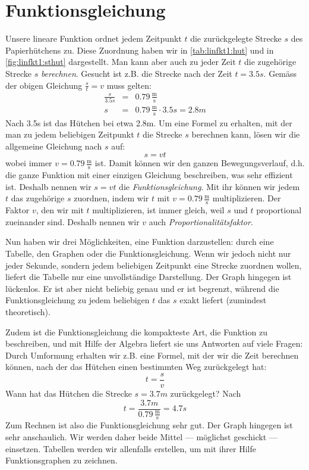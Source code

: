 \documentclass[%
11pt,%
twoside,%
titlepage,%
german,%
headsepline%
]{scrartcl}
\newcommand{\ufrac}[2]{\ensuremath{\,\frac{\mathrm{#1}}{\mathrm{#2}}}}
\begin{document}
\section{Funktionsgleichung}
\label{linfkt1:gleichung}

Unsere lineare Funktion ordnet jedem Zeitpunkt $t$ die zur\"uckgelegte Strecke $s$ des Papierh\"utchens zu. Diese Zuordnung haben wir in \ref{tab:linfkt1:hut} und in \ref{fig:linfkt1:sthut} dargestellt. Man kann aber auch zu jeder Zeit $t$ die zugeh\"orige Strecke $s$ \emph{berechnen}. Gesucht ist z.B. die Strecke nach der Zeit $t=3.5\unit{s}$. Gem\"ass der obigen Gleichung $\frac{s}{t}=v$ muss gelten:
\begin{eqnarray*}
\frac{s}{3.5\unit{s}} & = & 0.79\ufrac{m}{s} \\
s & = & 0.79\ufrac{m}{s}\cdot 3.5\unit{s}=2.8\unit{m}
\end{eqnarray*}
Nach 3.5\unit{s} ist das H\"utchen bei etwa 2.8\unit{m}. Um eine Formel zu erhalten, mit der man zu jedem beliebigen Zeitpunkt $t$ die Strecke $s$ berechnen kann, l\"osen wir die allgemeine Gleichung nach $s$ auf:
\begin{displaymath}
s = v t
\end{displaymath}
wobei immer $v=0.79\ufrac{m}{s}$ ist. Damit k\"onnen wir den ganzen Bewegungsverlauf, d.h. die ganze Funktion mit einer einzigen Gleichung beschreiben, was sehr effizient ist. Deshalb nennen wir $s=vt$ die \emph{Funktionsgleichung}. Mit ihr k\"onnen wir jedem $t$ das zugeh\"orige $s$ zuordnen, indem wir $t$ mit $v=0.79\ufrac{m}{s}$ multiplizieren. Der Faktor $v$, den wir mit $t$ multiplizieren, ist immer gleich, weil $s$ und $t$ proportional zueinander sind. Deshalb nennen wir $v$ auch \emph{Proportionalit\"atsfaktor}.

Nun haben wir drei M\"oglichkeiten, eine Funktion darzustellen: durch eine Tabelle, den Graphen oder die Funktionsgleichung. Wenn wir jedoch nicht nur jeder Sekunde, sondern jedem beliebigen Zeitpunkt eine Strecke zuordnen wollen, liefert die Tabelle nur eine unvollst\"andige Darstellung. Der Graph hingegen ist l\"uckenlos. Er ist aber nicht beliebig genau und er ist begrenzt, w\"ahrend die Funktionsgleichung zu jedem beliebigen $t$ das $s$ exakt liefert (zumindest theoretisch).

Zudem ist die Funktionsgleichung die kompakteste Art, die Funktion zu beschreiben, und mit Hilfe der Algebra liefert sie uns Antworten auf viele Fragen: Durch Umformung erhalten wir z.B. eine Formel, mit der wir die Zeit berechnen k\"onnen, nach der das H\"utchen einen bestimmten Weg zur\"uckgelegt hat:
\begin{displaymath}
t = \frac{s}{v}
\end{displaymath}
Wann hat das H\"utchen die Strecke $s=3.7\unit{m}$ zur\"uckgelegt? Nach
\begin{displaymath}
t = \frac{3.7\unit{m}}{0.79\ufrac{m}{s}}=4.7\unit{s}
\end{displaymath}
Zum Rechnen ist also die Funktionsgleichung sehr gut. Der Graph hingegen ist sehr anschaulich. Wir werden daher beide Mittel --- m\"oglichst geschickt --- einsetzen. Tabellen werden wir allenfalls erstellen, um mit ihrer Hilfe Funktionsgraphen zu zeichnen.
\end{document}
